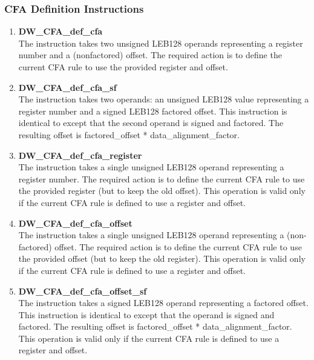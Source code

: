\subsubsection{CFA Definition Instructions}
\label{chap:cfadefinitioninstructions}

\begin{enumerate}[1.]
\item \textbf{DW\-\_CFA\-\_def\-\_cfa} \\
The  instruction takes two unsigned LEB128
operands representing a register number and a (non\dash factored)
offset. The required action is to define the current CFA rule
to use the provided register and offset.

\item \textbf{ DW\-\_CFA\-\_def\-\_cfa\-\_sf} \\
The  instruction takes two operands:
an unsigned LEB128 value representing a register number and a
signed LEB128 factored offset. This instruction is identical
to  except that the second operand is signed
and factored. The resulting offset is factored\_offset *
data\_alignment\_factor.


\item \textbf{DW\-\_CFA\-\_def\-\_cfa\-\_register} \\
The  instruction takes a single
unsigned LEB128 operand representing a register number. The
required action is to define the current CFA rule to use
the provided register (but to keep the old offset). This
operation is valid only if the current CFA rule is defined
to use a register and offset.



\item \textbf{DW\-\_CFA\-\_def\-\_cfa\-\_offset} \\
The  instruction takes a single
unsigned LEB128 operand representing a (non-factored)
offset. The required action is to define the current CFA rule
to use the provided offset (but to keep the old register). This
operation is valid only if the current CFA rule is defined
to use a register and offset.


\item \textbf{DW\-\_CFA\-\_def\-\_cfa\-\_offset\-\_sf} \\
The  instruction takes a signed
LEB128 operand representing a factored offset. This instruction
is identical to  except that the
operand is signed and factored. The resulting offset is
factored\_offset * data\_alignment\_factor. This operation
is valid only if the current CFA rule is defined to use a
register and offset.


\end{enumerate}
